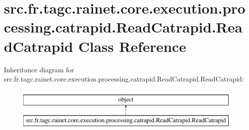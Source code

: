 \hypertarget{classsrc_1_1fr_1_1tagc_1_1rainet_1_1core_1_1execution_1_1processing_1_1catrapid_1_1ReadCatrapid_1_1ReadCatrapid}{\section{src.\-fr.\-tagc.\-rainet.\-core.\-execution.\-processing.\-catrapid.\-Read\-Catrapid.\-Read\-Catrapid Class Reference}
\label{classsrc_1_1fr_1_1tagc_1_1rainet_1_1core_1_1execution_1_1processing_1_1catrapid_1_1ReadCatrapid_1_1ReadCatrapid}
}
Inheritance diagram for src.\-fr.\-tagc.\-rainet.\-core.\-execution.\-processing.\-catrapid.\-Read\-Catrapid.\-Read\-Catrapid\-:\begin{figure}[H]
\begin{center}
\leavevmode
\includegraphics[height=2.000000cm]{classsrc_1_1fr_1_1tagc_1_1rainet_1_1core_1_1execution_1_1processing_1_1catrapid_1_1ReadCatrapid_1_1ReadCatrapid}
\end{center}
\end{figure}

